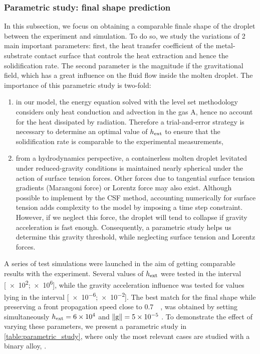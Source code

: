 \subsubsection{Parametric study: final shape prediction}

In this subsection, we focus on obtaining a comparable finale shape of the droplet between the experiment and simulation.
To do so, we study the variations of 2 main important parameters: first, the heat transfer coefficient of the metal-substrate contact surface that controls the heat extraction and hence the solidification rate. 
The second parameter is the magnitude if the gravitational field,
which has a great influence on the fluid flow inside the molten droplet.
The importance of this parametric study is two-fold: 
\begin{enumerate}
\itemsep0em

\item in our model, the energy equation solved with the level set methodology considers only heat conduction 
and advection in the gas A, hence no account for the heat dissipated by radiation.
Therefore a trial-and-error strategy is necessary to determine an optimal value of $h_{\text{ext}}$ 
to ensure that the solidification rate is comparable to the experimental measurements,

\item from a hydrodynamics perspective, a containerless molten droplet levitated under reduced-gravity conditions is maintained nearly spherical 
under the action of surface tension forces. Other forces due to tangential surface tension gradients (Marangoni force) or Lorentz force may also exist.
Although possible to implement by the CSF method, accounting numerically for surface tension adds complexity to the model by imposing
a time step constraint. However, if we neglect this force, the droplet will tend to collapse if gravity acceleration is fast enough.
Consequently, a parametric study helps us determine this gravity threshold, while neglecting surface tension and Lorentz forces. 
\end{enumerate}

A series of test simulations were launched in the aim of getting comparable results with the experiment.
Several values of $h_{\text{ext}}$ were tested in the interval [\num{e2};\num{e6}]\si{\uhconvec}, while the gravity acceleration influence was tested
for values lying in the interval [\num{e-6};\num{e-2}]\si{\uacceleration}. The best match for the final shape while preserving a front propagation
speed close to \SI{0.7}{\milli \uvelocity}, was obtained by setting simultaneously $h_{\text{ext}}=6 \times 10^{4}$ \si{\uhconvec} and $\lVert \boldsymbol{\text{g}} \rVert=5\times 10^{-5}$ \si{\uacceleration}.
To demonstrate the effect of varying these parameters, we present a parametric study in \cref{table:parametric_study}, where only the most relevant cases are studied with
a binary alloy, .

